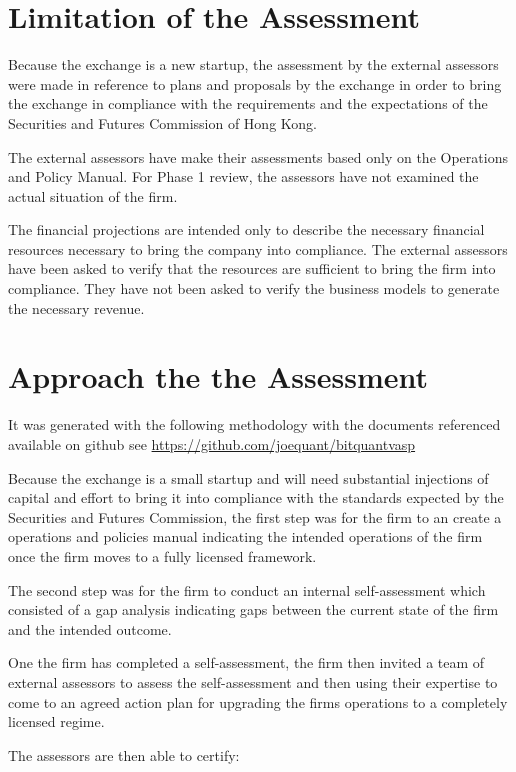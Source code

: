 \documentclass[]{report}
\begin{document}
\section{Limitation of the Assessment}
Because the exchange is a new startup, the assessment by the external
assessors were made in reference to plans and proposals by the
exchange in order to bring the exchange in compliance with the
requirements and the expectations of the Securities and Futures
Commission of Hong Kong.

The external assessors have make their assessments based only on the
Operations and Policy Manual.  For Phase 1 review, the assessors have
not examined the actual situation of the firm.

The financial projections are intended only to describe the necessary
financial resources necessary to bring the company into compliance.
The external assessors have been asked to verify that the resources
are sufficient to bring the firm into compliance.  They have not been
asked to verify the business models to generate the necessary revenue.

\section{Approach the the Assessment}

It was generated with the following methodology with the documents
referenced available on github see \href{https://github.com/joequant/bitquant\-vasp}{https://github.com/joequant/bitquant\-vasp}

Because the exchange is a small startup and will need substantial
injections of capital and effort to bring it into compliance with the
standards expected by the Securities and Futures Commission, the first
step was for the firm to an create a operations and policies manual
indicating the intended operations of the firm once the firm moves to
a fully licensed framework.

The second step was for the firm to conduct an internal
self-assessment which consisted of a gap analysis indicating gaps
between the current state of the firm and the intended outcome.

One the firm has completed a self-assessment, the firm then invited a
team of external assessors to assess the self-assessment and then
using their expertise to come to an agreed action plan for upgrading
the firms operations to a completely licensed regime.

The assessors are then able to certify:
\end{document}
